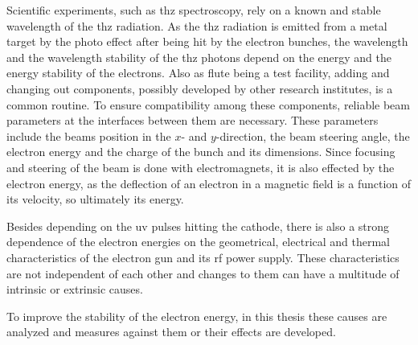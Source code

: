 Scientific experiments, such as \gls{thz} spectroscopy, rely on a known and stable wavelength of the \gls{thz} radiation. As the \gls{thz} radiation is emitted from a metal target by the photo effect after being hit by the electron bunches, the wavelength and the wavelength stability of the \gls{thz} photons depend on the energy and the energy stability of the electrons.
Also as \gls{flute} being a test facility, adding and changing out components, possibly developed by other research institutes, is a common routine. To ensure compatibility among these components, reliable beam parameters at the interfaces between them are necessary. These parameters include the beams position in the $x$- and $y$-direction, the beam steering angle, the electron energy and the charge of the bunch and its dimensions. Since focusing and steering of the beam is done with electromagnets, it is also effected by the electron energy, as the deflection of an electron in a magnetic field is a function of its velocity, so ultimately its energy.

Besides depending on the \gls{uv} pulses hitting the cathode, there is also a strong dependence of the electron energies on the geometrical, electrical and thermal characteristics of the electron gun and its \gls{rf} power supply. These characteristics are not independent of each other and changes to them can have a multitude of intrinsic or extrinsic causes.

To improve the stability of the electron energy, in this thesis these causes are analyzed and measures against them or their effects are developed.

